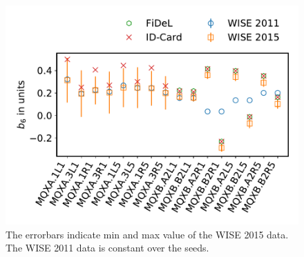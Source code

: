 \begin{figure}[h!]
    \centering
    \includegraphics[width=.8\textwidth]{images/plot.Error_distributions_for_b6.pdf}
    \caption{\comparecap The errorbars indicate min and max value of the WISE 2015 data. 
    The WISE 2011 data is constant over the seeds.}
    \label{fig:Compare}
\end{figure}

